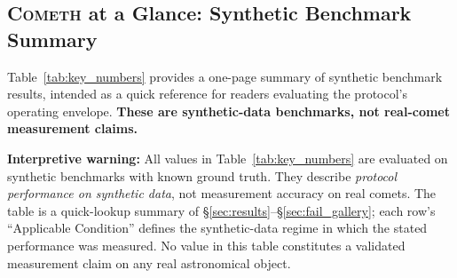 \documentclass[usenatbib]{mnras}
\begin{document}
\subsection{\texorpdfstring{\textsc{Cometh}}{COMETH} at a Glance: Synthetic Benchmark Summary}

Table~\ref{tab:key_numbers} provides a one-page summary of synthetic benchmark results, intended as a quick reference for readers evaluating the protocol's operating envelope. \textbf{These are synthetic-data benchmarks, not real-comet measurement claims.}

\textbf{Interpretive warning:} All values in Table~\ref{tab:key_numbers} are evaluated on synthetic benchmarks with known ground truth. They describe \textit{protocol performance on synthetic data}, not measurement accuracy on real comets. The table is a quick-lookup summary of \S\ref{sec:results}--\S\ref{sec:fail_gallery}; each row's ``Applicable Condition'' defines the synthetic-data regime in which the stated performance was measured. No value in this table constitutes a validated measurement claim on any real astronomical object.
\end{document}
